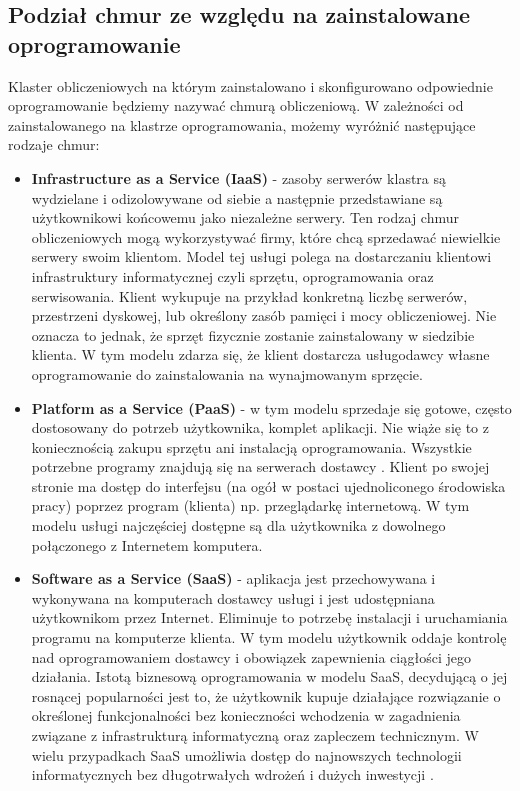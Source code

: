\documentclass[10pt,a4paper,titlepage,twoside]{report}
\begin{document}
\subsection{Podział chmur ze względu na zainstalowane oprogramowanie}\indent \indent Klaster obliczeniowych na którym zainstalowano i skonfigurowano odpowiednie oprogramowanie będziemy nazywać chmurą obliczeniową. W zależności od zainstalowanego na klastrze oprogramowania, możemy wyróżnić następujące rodzaje chmur\cite{ad6}:
\begin{itemize}
	\item \textbf{Infrastructure as a Service (IaaS)} - zasoby serwerów klastra są wydzielane i odizolowywane od siebie a następnie przedstawiane są użytkownikowi końcowemu jako niezależne serwery. Ten rodzaj chmur obliczeniowych mogą wykorzystywać firmy, które chcą sprzedawać niewielkie serwery swoim klientom. Model tej usługi polega na dostarczaniu klientowi infrastruktury informatycznej czyli sprzętu, oprogramowania oraz serwisowania. Klient wykupuje na przykład konkretną liczbę serwerów, przestrzeni dyskowej, lub określony zasób pamięci i mocy obliczeniowej. Nie oznacza to jednak, że sprzęt fizycznie zostanie zainstalowany w siedzibie klienta\cite{ad7}. W tym modelu zdarza się, że klient dostarcza usługodawcy własne oprogramowanie do zainstalowania na wynajmowanym sprzęcie.
	\item \textbf{Platform as a Service (PaaS)} - w tym modelu sprzedaje się gotowe, często dostosowany do potrzeb użytkownika, komplet aplikacji. Nie wiąże się to z koniecznością zakupu sprzętu ani instalacją oprogramowania. Wszystkie potrzebne programy znajdują się na serwerach dostawcy \cite{ad9}. Klient po swojej stronie ma dostęp do interfejsu (na ogół w postaci ujednoliconego środowiska pracy) poprzez program (klienta) np. przeglądarkę internetową. W tym modelu usługi najczęściej dostępne są dla użytkownika z dowolnego połączonego z Internetem komputera.
	\item \textbf{Software as a Service (SaaS)} - aplikacja jest przechowywana i wykonywana na komputerach dostawcy usługi i jest udostępniana użytkownikom przez Internet. Eliminuje to potrzebę instalacji i uruchamiania programu na komputerze klienta. W tym modelu użytkownik oddaje kontrolę nad oprogramowaniem dostawcy i obowiązek zapewnienia ciągłości jego działania. Istotą biznesową oprogramowania w modelu SaaS, decydującą o jej rosnącej popularności jest to, że użytkownik kupuje działające rozwiązanie o określonej funkcjonalności bez konieczności wchodzenia w zagadnienia związane z infrastrukturą informatyczną oraz zapleczem technicznym. W wielu przypadkach SaaS umożliwia dostęp do najnowszych technologii informatycznych bez długotrwałych wdrożeń i dużych inwestycji \cite{ad8}.

\end{itemize}
\end{document}
